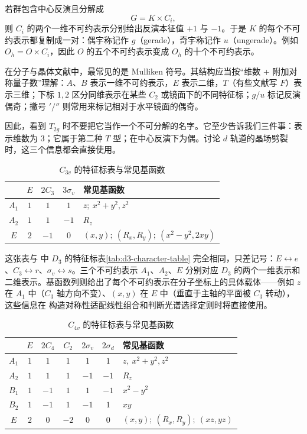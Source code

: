 若群包含中心反演且分解成
\[
G=K\times C_i,
\]
则 $C_i$ 的两个一维不可约表示分别给出反演本征值 $+1$ 与 $-1$。于是 $K$ 的每个不可约表示都复制成一对：偶宇称记作 $g$（gerade），奇宇称记作 $u$（ungerade）。例如 $O_h=O\times C_i$，因此 $O$ 的五个不可约表示变成 $O_h$ 的十个不可约表示。

在分子与晶体文献中，最常见的是 Mulliken 符号。其结构应当按“维数 + 附加对称量子数”理解：$A$、$B$ 表示一维不可约表示，$E$ 表示二维，$T$（有些文献写 $F$）表示三维；下标 $1,2$ 区分同维表示在某些 $C_2$ 或镜面下的不同特征标；$g/u$ 标记反演偶奇；撇号 $' / ''$ 则常用来标记相对于水平镜面的偶奇。

因此，看到 $T_{2g}$ 时不要把它当作一个不可分解的名字。它至少告诉我们三件事：表示维数为 $3$；它属于第二种 $T$ 型；在中心反演下为偶。讨论 $d$ 轨道的晶场劈裂时，这三个信息都会直接使用。

\begin{table}[htbp]
\centering
\caption{$C_{3v}$ 的特征标表与常见基函数}
\label{tab:c3v-character}
\begin{tabular}{c|ccc|l}
\toprule
 & $E$ & $2C_3$ & $3\sigma_v$ & 常见基函数 \\
\midrule
$A_1$ & $1$ & $1$ & $1$ & $z;\ x^2+y^2,z^2$ \\
$A_2$ & $1$ & $1$ & $-1$ & $R_z$ \\
$E$   & $2$ & $-1$ & $0$ & $(x,y);\ (R_x,R_y);\ (x^2-y^2,2xy)$ \\
\bottomrule
\end{tabular}
\end{table}

这张表与 中 $D_3$ 的特征标表\cref{tab:d3-character-table} 完全相同，只差记号：$E\leftrightarrow e$、$C_3\leftrightarrow r$、$\sigma_v\leftrightarrow s$。三个不可约表示 $A_1$、$A_2$、$E$ 分别对应 $D_3$ 的两个一维表示和二维表示。基函数列则给出了每个不可约表示在分子坐标上的具体载体——例如 $z$ 在 $A_1$ 中（$C_3$ 轴方向不变）、$(x,y)$ 在 $E$ 中（垂直于主轴的平面被 $C_3$ 转动），这些信息在 构造对称性适配线性组合和判断光谱选择定则时将直接使用。

\begin{table}[htbp]
\centering
\caption{$C_{4v}$ 的特征标表与常见基函数}
\label{tab:c4v-character}
\begin{tabular}{c|ccccc|l}
\toprule
 & $E$ & $2C_4$ & $C_2$ & $2\sigma_v$ & $2\sigma_d$ & 常见基函数 \\
\midrule
$A_1$ & $1$&$1$&$1$&$1$&$1$ & $z,\ x^2+y^2,z^2$ \\
$A_2$ & $1$&$1$&$1$&$-1$&$-1$ & $R_z$ \\
$B_1$ & $1$&$-1$&$1$&$1$&$-1$ & $x^2-y^2$ \\
$B_2$ & $1$&$-1$&$1$&$-1$&$1$ & $xy$ \\
$E$   & $2$&$0$&$-2$&$0$&$0$ & $(x,y);\ (R_x,R_y);\ (xz,yz)$ \\
\bottomrule
\end{tabular}
\end{table}

